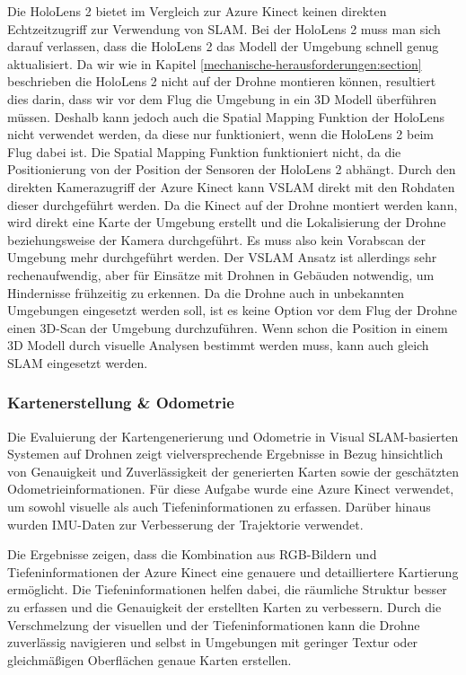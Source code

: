 Die HoloLens 2 bietet im Vergleich zur Azure Kinect keinen direkten Echtzeitzugriff zur Verwendung von \ac{SLAM}. Bei der HoloLens 2 muss man sich darauf verlassen, dass die HoloLens 2 das Modell der Umgebung schnell genug aktualisiert. Da wir wie in Kapitel \ref{mechanische-herausforderungen:section} beschrieben die HoloLens 2 nicht auf der Drohne montieren können, resultiert dies darin, dass wir vor dem Flug die Umgebung in ein 3D Modell überführen müssen. Deshalb kann jedoch auch die Spatial Mapping Funktion der HoloLens nicht verwendet werden, da diese nur funktioniert, wenn die HoloLens 2 beim Flug dabei ist.
Die Spatial Mapping Funktion funktioniert nicht, da die Positionierung von der Position der Sensoren der HoloLens 2 abhängt.
Durch den direkten Kamerazugriff der Azure Kinect kann \ac{VSLAM} direkt mit den Rohdaten dieser durchgeführt werden. Da die Kinect auf der Drohne montiert werden kann, wird direkt eine Karte der Umgebung erstellt und die Lokalisierung der Drohne beziehungsweise der Kamera durchgeführt. Es muss also kein Vorabscan der Umgebung mehr durchgeführt werden. Der \ac{VSLAM} Ansatz ist allerdings sehr rechenaufwendig, aber für Einsätze mit Drohnen in Gebäuden notwendig, um Hindernisse frühzeitig zu erkennen. Da die Drohne auch in unbekannten Umgebungen eingesetzt werden soll, ist es keine Option vor dem Flug der Drohne einen 3D-Scan der Umgebung durchzuführen. Wenn schon die Position in einem 3D Modell durch visuelle Analysen bestimmt werden muss, kann auch gleich \ac{SLAM} eingesetzt werden.

\subsubsection{Kartenerstellung \& Odometrie}

Die Evaluierung der Kartengenerierung und Odometrie in Visual SLAM-basierten Systemen auf Drohnen zeigt vielversprechende Ergebnisse in Bezug hinsichtlich von Genauigkeit und Zuverlässigkeit der generierten Karten sowie der geschätzten Odometrieinformationen. Für diese Aufgabe wurde eine Azure Kinect verwendet, um sowohl visuelle als auch Tiefeninformationen zu erfassen. Darüber hinaus wurden \ac{IMU}-Daten zur Verbesserung der Trajektorie verwendet.

Die Ergebnisse zeigen, dass die Kombination aus RGB-Bildern und Tiefeninformationen der Azure Kinect eine genauere und detailliertere Kartierung ermöglicht. Die Tiefeninformationen helfen dabei, die räumliche Struktur besser zu erfassen und die Genauigkeit der erstellten Karten zu verbessern. Durch die Verschmelzung der visuellen und der Tiefeninformationen kann die Drohne zuverlässig navigieren und selbst in Umgebungen mit geringer Textur oder gleichmäßigen Oberflächen genaue Karten erstellen.

